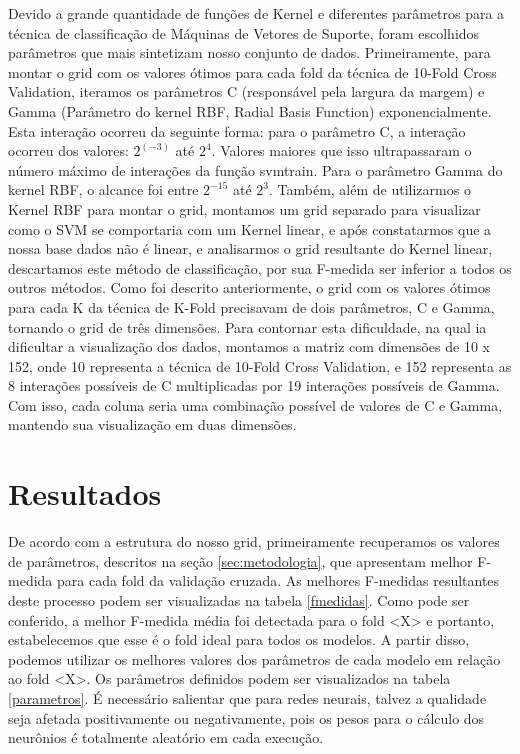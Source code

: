 \documentclass[10pt, conference, compsocconf]{IEEEtran}
\begin{document}
Devido a grande quantidade de funções de Kernel e diferentes parâmetros para a técnica de classificação de Máquinas de Vetores de Suporte, foram escolhidos parâmetros que mais sintetizam nosso conjunto de dados. Primeiramente, para montar o grid com os valores ótimos para cada fold da técnica de 10-Fold Cross Validation, iteramos os parâmetros C (responsável pela largura da margem) e Gamma (Parâmetro do kernel RBF, Radial Basis Function) exponencialmente.
Esta interação ocorreu da seguinte forma: para o parâmetro C, a interação ocorreu dos valores: $2^(-3)$ até $2^4$. Valores maiores que isso ultrapassaram o número máximo de interações da função svmtrain. Para o parâmetro Gamma do kernel RBF, o alcance foi entre $2^{-15}$ até $2^3$.
Também, além de utilizarmos o Kernel RBF para montar o grid, montamos um grid separado para visualizar como o SVM se comportaria com um Kernel linear, e após constatarmos que a nossa base dados não é linear, e analisarmos o grid resultante do Kernel linear, descartamos este método de classificação, por sua F-medida ser inferior a todos os outros métodos.
Como foi descrito anteriormente, o grid com os valores ótimos para cada K da técnica de K-Fold precisavam de dois parâmetros, C e Gamma, tornando o grid de três dimensões. Para contornar esta dificuldade, na qual ia dificultar a visualização dos dados, montamos a matriz com dimensões de 10 x 152, onde 10 representa a técnica de 10-Fold Cross Validation, e 152 representa as 8 interações possíveis de C multiplicadas por 19 interações possíveis de Gamma. Com isso, cada coluna seria uma combinação possível de valores de C e Gamma, mantendo sua visualização em duas dimensões.



\section{Resultados}\label{sec:resultados}
De acordo com a estrutura do nosso grid, primeiramente recuperamos os valores 
de parâmetros, descritos na seção \ref{sec:metodologia}, que apresentam melhor 
F-medida para cada fold da validação cruzada. As melhores F-medidas resultantes 
deste processo podem ser visualizadas na tabela \ref{fmedidas}. Como pode 
ser conferido, a melhor F-medida média foi detectada para o fold <X> e 
portanto, estabelecemos que esse é o fold ideal para todos os modelos. A partir 
disso, podemos utilizar os melhores valores dos parâmetros de cada modelo em 
relação ao fold <X>. Os parâmetros definidos podem ser visualizados na tabela
\ref{parametros}. É necessário salientar que para redes neurais, talvez a 
qualidade seja afetada positivamente ou negativamente, pois os pesos para o 
cálculo dos neurônios é totalmente aleatório em cada execução.
\end{document}
